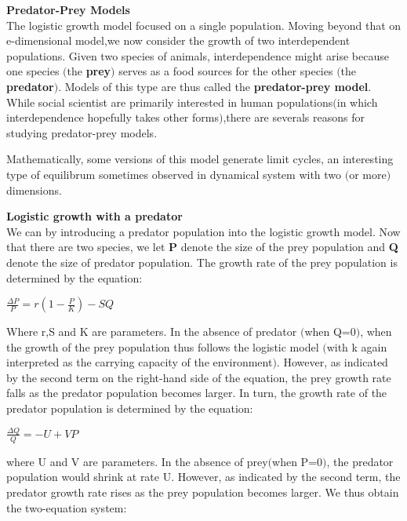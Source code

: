 \documentclass[a4paper,12pt]{report}
\numberwithin{equation}{section}
\begin{document}
\textbf{Predator-Prey Models}\\
\indent The logistic growth model focused on a single population. Moving beyond that on e-dimensional model,we now consider the growth of two interdependent populations. Given two species of animals, interdependence might arise because one species $($the \textbf{prey}$)$ serves as a food sources for the other species $($the \textbf{predator}$)$. Models of this type are thus called the \textbf{predator-prey model}. While social scientist are primarily interested in human populations$($in which interdependence hopefully takes other forms$)$,there are severals reasons for studying predator-prey models.

Mathematically, some versions of this model generate limit cycles, an interesting type of equilibrum sometimes observed in dynamical system with two $($or more$)$ dimensions.



\textbf{Logistic growth with a predator}\\
\indent We can by introducing a predator population into the logistic growth model. Now that there are two species, we let \textbf{P} denote the size of the prey population and \textbf{Q} denote the size of predator population. The growth rate of the prey population is determined by the equation:\\

\begin{center}
$\frac{\Delta P}{P}= r(1-\frac{P}{K})-SQ$
\end{center}
Where r,S and K are parameters. In the absence of predator $($when Q=0$)$, when the growth of the prey population thus follows the logistic model $($with k again interpreted as the carrying capacity of the environment$)$. However, as indicated by the second term on the right-hand side of the equation, the prey growth rate falls as the predator population becomes larger. In turn, the growth rate of the predator population is determined by the equation:\\

\begin{center}
$\frac{\Delta Q}{Q}=-U+VP$
\end{center}

where U and V are parameters. In the absence of prey$($when P=0$)$, the predator population would shrink at rate U. However, as indicated by the second term, the predator growth rate rises as the prey population becomes larger. We thus obtain the two-equation system:\\
\end{document}
